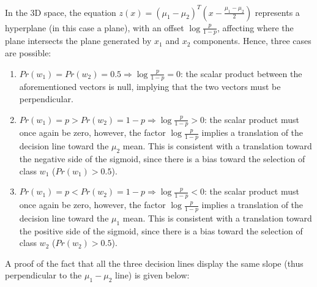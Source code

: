 In the 3D space, the equation \(z(x)=(\mu_1-\mu_2)^T(x-\frac{\mu_1-\mu_2}{2})\)
represents a hyperplane (in this case a plane), with an offset
\(\log{\frac{p}{1-p}}\), affecting where the plane intersects the plane
generated by \(x_1\) and \(x_2\) components.
Hence, three cases are possible:
\begin{enumerate}
    \item \(Pr(w_1)=Pr(w_2)=0.5\Rightarrow\log{\frac{p}{1-p}}=0\):
    the scalar product between the aforementioned vectors is null, implying
    that the two vectors must be perpendicular.
    \item \(Pr(w_1)=p>Pr(w_2)=1-p\Rightarrow\log{\frac{p}{1-p}}>0\):
    the scalar product must once again be zero, however, the factor
    \(\log{\frac{p}{1-p}}\) implies a translation of the decision line
    toward the \(\mu_2\) mean. This is consistent with a translation
    toward the negative side of the sigmoid, since there is a bias
    toward the selection of class \(w_1\) (\(Pr(w_1)>0.5\)).
    \item \(Pr(w_1)=p<Pr(w_2)=1-p\Rightarrow\log{\frac{p}{1-p}}<0\):
    the scalar product must once again be zero, however, the factor
    \(\log{\frac{p}{1-p}}\) implies a translation of the decision line
    toward the \(\mu_1\) mean. This is consistent with a translation
    toward the positive side of the sigmoid, since there is a bias
    toward the selection of class \(w_2\) (\(Pr(w_2)>0.5\)).
  \end{enumerate}
  A proof of the fact that all the three decision lines display the same
  slope (thus perpendicular to the \(\mu_1-\mu_2\) line) is given below:
